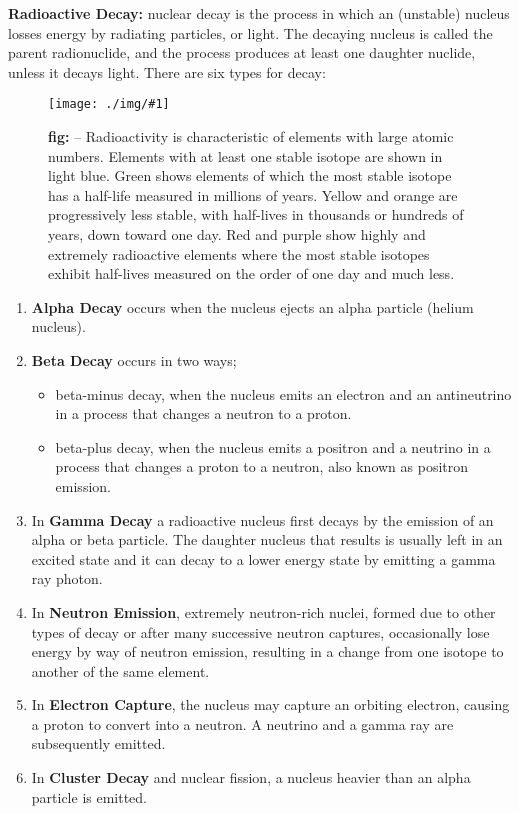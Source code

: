\documentclass[10pt,a4paper]{article}
\newcounter{figurecounter}
\newcommand{\img}[3]{
    \begin{figure}[h!]
        \centering
        \captionsetup{justification=centering,margin=0.5cm,labelformat=empty}
        \texttt{[image: ./img/\#1]}
        \label{figure}
        \caption{\small\textbf{fig: \thefigurecounter} -- \textcolor{darkliver}{#3}}
    \end{figure}
    \addtocounter{figurecounter}{1}}
\begin{document}
\textbf{Radioactive Decay:} nuclear decay is the process in which an (unstable) nucleus losses energy by radiating particles, or light. The decaying nucleus is called the parent radionuclide, and the process produces at least one daughter nuclide, unless it decays light. There are six types for decay:
\img{ptableradioactive}{1}{Radioactivity is characteristic of elements with large atomic numbers. Elements with at least one stable isotope are shown in light blue. Green shows elements of which the most stable isotope has a half-life measured in millions of years. Yellow and orange are progressively less stable, with half-lives in thousands or hundreds of years, down toward one day. Red and purple show highly and extremely radioactive elements where the most stable isotopes exhibit half-lives measured on the order of one day and much less.}
\begin{enumerate}
    \item \textbf{Alpha Decay} occurs when the nucleus ejects an alpha particle (helium nucleus).

    \item \textbf{Beta Decay} occurs in two ways;
    \begin{itemize}
        \item beta-minus decay, when the nucleus emits an electron and an antineutrino in a process that changes a neutron to a proton.
        \item  beta-plus decay, when the nucleus emits a positron and a neutrino in a process that changes a proton to a neutron, also known as positron emission.
    \end{itemize}

    \item In \textbf{Gamma Decay} a radioactive nucleus first decays by the emission of an alpha or beta particle. The daughter nucleus that results is usually left in an excited state and it can decay to a lower energy state by emitting a gamma ray photon.

    \item In \textbf{Neutron Emission}, extremely neutron-rich nuclei, formed due to other types of decay or after many successive neutron captures, occasionally lose energy by way of neutron emission, resulting in a change from one isotope to another of the same element.
    
    \item In \textbf{Electron Capture}, the nucleus may capture an orbiting electron, causing a proton to convert into a neutron. A neutrino and a gamma ray are subsequently emitted.
    
    \item In \textbf{Cluster Decay} and nuclear fission, a nucleus heavier than an alpha particle is emitted.
\end{enumerate}
\end{document}

